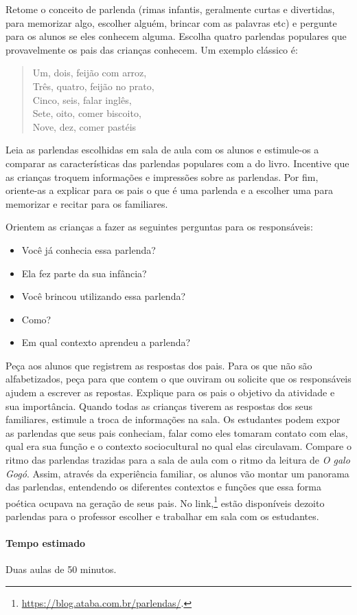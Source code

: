 \documentclass[11pt]{extarticle}
\begin{document}
Retome o conceito de parlenda (rimas infantis, geralmente curtas e divertidas, para memorizar algo, escolher alguém, brincar com as palavras etc) e pergunte para os alunos se eles conhecem alguma. Escolha quatro parlendas populares que provavelmente os pais das crianças conhecem. Um exemplo clássico é:

\begin{verse}
Um, dois, feijão com arroz,\\
Três, quatro, feijão no prato,\\
Cinco, seis, falar inglês,\\
Sete, oito, comer biscoito,\\
Nove, dez, comer pastéis
\end{verse}

Leia as parlendas escolhidas em sala de aula com os alunos e estimule-os a comparar as características das parlendas populares com a do livro. Incentive que as crianças troquem informações e impressões sobre as parlendas. Por fim, oriente-as a explicar para os pais o que é uma parlenda e a escolher uma para memorizar e recitar para os familiares.

Orientem as crianças a fazer as seguintes perguntas para os responsáveis:

\begin{itemize}
\item Você já conhecia essa parlenda?

\item Ela fez parte da sua infância?

\item Você brincou utilizando essa parlenda?

\item Como?

\item Em qual contexto aprendeu a parlenda?
\end{itemize}

Peça aos alunos que registrem as respostas dos pais. Para os que não são alfabetizados, peça para que contem o que ouviram ou solicite que os responsáveis ajudem a escrever as repostas. Explique para os pais o objetivo da atividade e sua importância.
Quando todas as crianças tiverem as respostas dos seus familiares, estimule a troca de informações na sala. Os estudantes podem expor as parlendas que seus pais conheciam, falar como eles tomaram contato com elas, qual era sua função e o contexto sociocultural no qual elas circulavam. Compare o ritmo das parlendas trazidas para a sala de aula com o ritmo da leitura de \textit{O galo Gogó}. Assim, através da experiência familiar, os alunos vão montar um panorama das parlendas, entendendo os diferentes contextos e funções que essa forma poética ocupava na geração de seus pais.
No link,\footnote{\url{https://blog.ataba.com.br/parlendas/}.} estão disponíveis dezoito parlendas para o professor escolher e trabalhar em sala com os estudantes. 

\paragraph{Tempo estimado} Duas aulas de 50 minutos.
\end{document}
